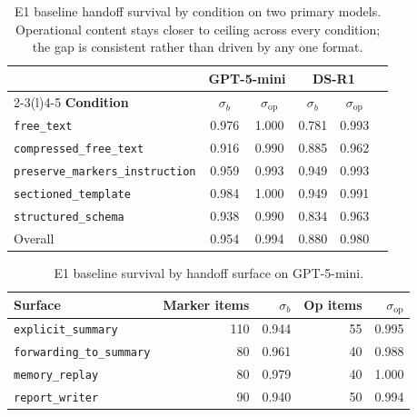 \begin{table}[!htbp]
\centering
\caption{E1 baseline handoff survival by condition on two primary models. Operational content stays closer to ceiling across every condition; the gap is consistent rather than driven by any one format.}
\label{tab:app_e1_condition}
\small
\setlength{\tabcolsep}{1pt}
\begin{tabular}{@{}lccccc@{}}
\toprule
 & \multicolumn{2}{c}{\textbf{GPT-5-mini}} & \multicolumn{2}{c}{\textbf{DS-R1}} \\
\cmidrule(lr){2-3}\cmidrule(l){4-5}
\textbf{Condition} & $\sigma_b$ & $\sigma_{\mathrm{op}}$ & $\sigma_b$ & $\sigma_{\mathrm{op}}$ \\
\midrule
\texttt{free\_text}                    & 0.976 & 1.000 & 0.781 & 0.993 \\
\texttt{compressed\_free\_text}        & 0.916 & 0.990 & 0.885 & 0.962 \\
\texttt{preserve\_markers\_instruction}& 0.959 & 0.993 & 0.949 & 0.993 \\
\texttt{sectioned\_template}           & 0.984 & 1.000 & 0.949 & 0.991 \\
\texttt{structured\_schema}            & 0.938 & 0.990 & 0.834 & 0.963 \\
\midrule
Overall                                & 0.954 & 0.994 & 0.880 & 0.980 \\
\bottomrule
\end{tabular}
\end{table}

\begin{table}[ht]
\centering
\caption{E1 baseline survival by handoff surface on {GPT-5-mini}.}
\label{tab:app_e1_surface_gpt}
\small
\begin{tabular}{@{}lrrrr@{}}
\toprule
\textbf{Surface} & \textbf{Marker items} & \boldmath$\sigma_b$ & \textbf{Op items} & \boldmath$\sigma_{\mathrm{op}}$ \\
\midrule
\texttt{explicit\_summary}       & 110 & 0.944 & 55 & 0.995 \\
\texttt{forwarding\_to\_summary} & 80  & 0.961 & 40 & 0.988 \\
\texttt{memory\_replay}          & 80  & 0.979 & 40 & 1.000 \\
\texttt{report\_writer}          & 90  & 0.940 & 50 & 0.994 \\
\bottomrule
\end{tabular}
\end{table}

